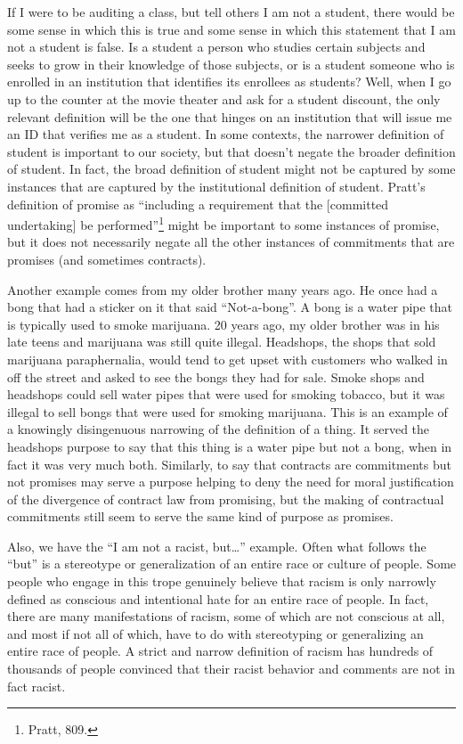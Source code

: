 If I were to be auditing a class, but tell others I am not a student,
there would be some sense in which this is true and some sense in which
this statement that I am not a student is false. Is a student a person
who studies certain subjects and seeks to grow in their knowledge of
those subjects, or is a student someone who is enrolled in an
institution that identifies its enrollees as students? Well, when I go
up to the counter at the movie theater and ask for a student discount,
the only relevant definition will be the one that hinges on an
institution that will issue me an ID that verifies me as a student. In
some contexts, the narrower definition of student is important to our
society, but that doesn't negate the broader definition of student. In
fact, the broad definition of student might not be captured by some
instances that are captured by the institutional definition of student.
Pratt's definition of promise as ``including a requirement that the
{[}committed undertaking{]} be performed''\footnote{Pratt, 809.} might
be important to some instances of promise, but it does not necessarily
negate all the other instances of commitments that are promises (and
sometimes contracts).

Another example comes from my older brother many years ago. He once had
a bong that had a sticker on it that said ``Not-a-bong''. A bong is a
water pipe that is typically used to smoke marijuana. 20 years ago, my
older brother was in his late teens and marijuana was still quite
illegal. Headshops, the shops that sold marijuana paraphernalia, would
tend to get upset with customers who walked in off the street and asked
to see the bongs they had for sale. Smoke shops and headshops could sell
water pipes that were used for smoking tobacco, but it was illegal to
sell bongs that were used for smoking marijuana. This is an example of a
knowingly disingenuous narrowing of the definition of a thing. It served
the headshops purpose to say that this thing is a water pipe but not a
bong, when in fact it was very much both. Similarly, to say that
contracts are commitments but not promises may serve a purpose helping
to deny the need for moral justification of the divergence of contract
law from promising, but the making of contractual commitments still seem
to serve the same kind of purpose as promises.

Also, we have the ``I am not a racist, but\ldots{}'' example. Often what
follows the ``but'' is a stereotype or generalization of an entire race
or culture of people. Some people who engage in this trope genuinely
believe that racism is only narrowly defined as conscious and
intentional hate for an entire race of people. In fact, there are many
manifestations of racism, some of which are not conscious at all, and
most if not all of which, have to do with stereotyping or generalizing
an entire race of people. A strict and narrow definition of racism has
hundreds of thousands of people convinced that their racist behavior and
comments are not in fact racist.

